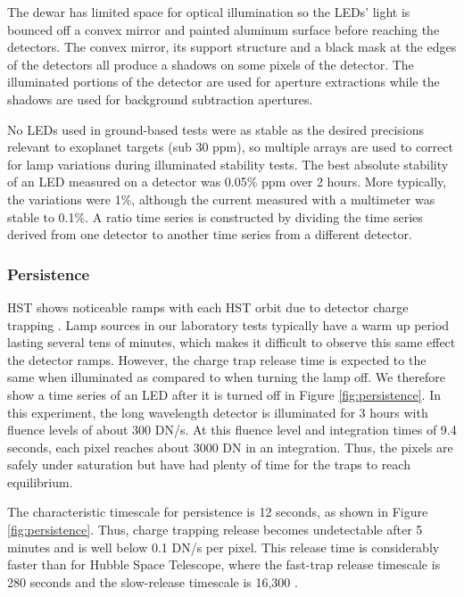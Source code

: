 \documentclass{aastex62}
\begin{document}
The dewar has limited space for optical illumination so the LEDs' light is bounced off a convex mirror and painted aluminum surface before reaching the detectors.
The convex mirror, its support structure and a black mask at the edges of the detectors all produce a shadows on some pixels of the detector.
The illuminated portions of the detector are used for aperture extractions while the shadows are used for background subtraction apertures.

No LEDs used in ground-based tests were as stable as the desired precisions relevant to exoplanet targets (sub 30 ppm), so multiple arrays are used to correct for lamp variations during illuminated stability tests.
The best absolute stability of an LED measured on a detector was 0.05\% ppm over 2 hours.
More typically, the variations were 1\%, although the current measured with a multimeter was stable to 0.1\%.
A ratio time series is constructed by dividing the time series derived from one detector to another time series from a different detector.

\subsubsection{Persistence}\label{sec:persistence}
HST shows noticeable ramps with each HST orbit due to detector charge trapping \citep{zhou2017chargeTrap}.
Lamp sources in our laboratory tests typically have a warm up period lasting several tens of minutes, which makes it difficult to observe this same effect the detector ramps.
However, the charge trap release time is expected to the same when illuminated as compared to when turning the lamp off.
We therefore show a time series of an LED after it is turned off in Figure \ref{fig:persistence}.
In this experiment, the long wavelength detector is illuminated for 3 hours with fluence levels of about 300 DN/s.
At this fluence level and integration times of 9.4 seconds, each pixel reaches about 3000 DN in an integration.
Thus, the pixels are safely under saturation but have had plenty of time for the traps to reach equilibrium.

The characteristic timescale for persistence is 12 seconds, as shown in Figure \ref{fig:persistence}.
Thus, charge trapping release becomes undetectable after 5 minutes and is well below 0.1 DN/s per pixel.
This release time is considerably faster than for Hubble Space Telescope, where the fast-trap release timescale is 280 seconds and the slow-release timescale is 16,300 \citep{zhou2017chargeTrap}.
\end{document}
